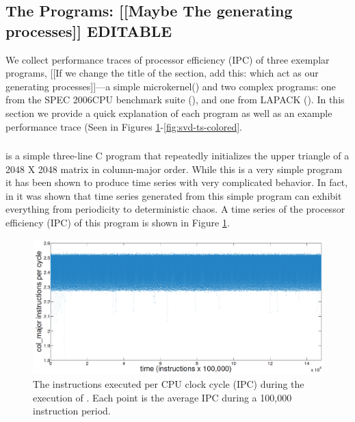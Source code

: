 \subsection{The Programs: [[Maybe The generating processes]]{\color{blue} EDITABLE}}
We collect performance traces of processor efficiency (IPC) of three exemplar programs, [[If we change the title of the section, add this: which act as our generating processes]]---a simple microkernel(\col) and two complex programs: one from the
SPEC 2006CPU benchmark suite (\gcc), and one from LAPACK (\svd). In this section we provide a quick explanation of each program as well as an example performance trace (Seen in Figures \ref{fig:col-ts}-\ref{fig:svd-ts-colored}.
\subsubsection{}
\col is a simple three-line C program that repeatedly initializes the upper triangle of a  2048 X 2048 matrix in column-major order. While this is a very simple program it has been shown to produce time series with very complicated behavior. In fact, in \cite{mytkowicz09} it was shown that time series generated from this simple program can exhibit everything from periodicity to deterministic chaos.  A time series of the processor efficiency (IPC) of this program is shown in Figure \ref{fig:col-ts}.

\begin{figure}[htbp]
  \centering
    \includegraphics[width=\columnwidth]{figs/colFullTS}
    \caption{The instructions executed per CPU clock cycle (IPC) during the execution of \col. Each point is the average IPC during a 100,000 instruction period.}
    \label{fig:col-ts}
  
  \end{figure}

\subsubsection{}

